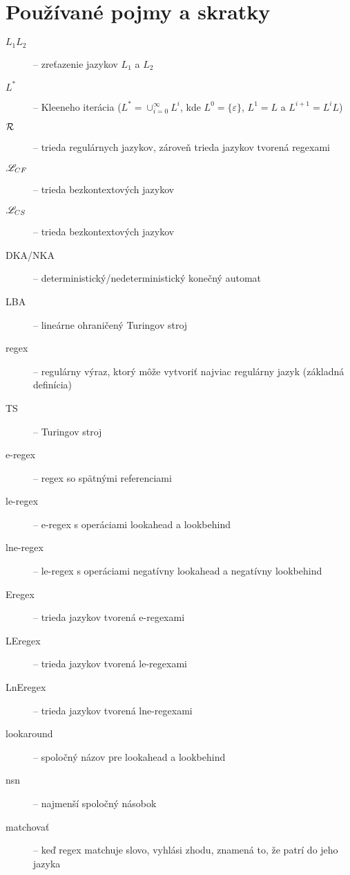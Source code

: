 \chapter*{Používané pojmy a skratky}
\label{chap:pojmy}

\begin{description}
\item[$ L_{1}L_{2} $] -- zreťazenie jazykov $ L_{1} $ a $ L_{2} $
\item[$ L^* $] -- Kleeneho iterácia ($L^*=\cup^{\infty}_{i=0}L^i$, kde $L^0=\lbrace \varepsilon \rbrace$, $L^1=L$ a $L^{i+1}=L^iL$)
\item[$ {\cal R} $] -- trieda regulárnych jazykov, zároveň trieda jazykov tvorená regexami
\item[$ \mathscr{L}_{CF}$] -- trieda bezkontextových jazykov
\item[$ \mathscr{L}_{CS}$] -- trieda bezkontextových jazykov
\item[DKA/NKA] -- deterministický/nedeterministický konečný automat
\item[LBA] -- lineárne ohraničený Turingov stroj
\item[regex] -- regulárny výraz, ktorý môže vytvoriť najviac regulárny jazyk (základná definícia)
\item[TS] -- Turingov stroj
\item[e-regex] -- regex so spätnými referenciami
\item[le-regex] -- e-regex s operáciami lookahead a lookbehind
\item[lne-regex] -- le-regex s operáciami negatívny lookahead a negatívny lookbehind
\item[Eregex] -- trieda jazykov tvorená e-regexami
\item[LEregex] -- trieda jazykov tvorená le-regexami
\item[LnEregex] -- trieda jazykov tvorená lne-regexami
\item[lookaround] -- spoločný názov pre lookahead a lookbehind
\item[nsn] -- najmenší spoločný násobok
\item[matchovať] -- keď regex matchuje slovo, vyhlási zhodu, znamená to, že patrí do jeho jazyka
\end{description}

